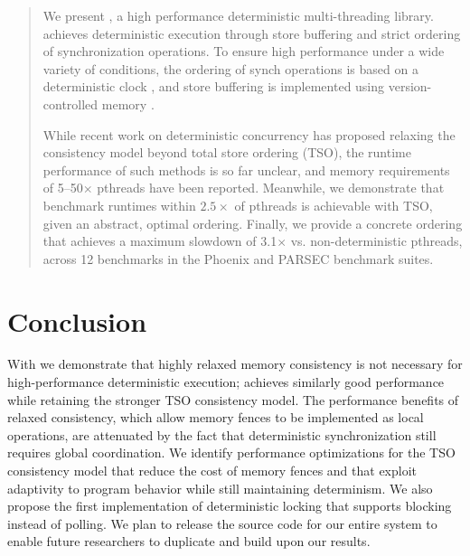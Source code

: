 \documentclass{sigplanconf}
\begin{document}
\newcommand{\TODO}[1]{\textbf{\textcolor{red}{[ TODO: #1]}}}


\begin{abstract}

We present \lib{}, a high performance deterministic multi-threading library. 
\lib{} achieves deterministic execution through store buffering and strict ordering of synchronization operations.
To ensure high performance under a wide variety of conditions, the ordering of synch operations is based on a deterministic clock \cite{olszewski_kendo:_2009}, 
and store buffering is implemented using version-controlled memory \cite{merrifield_conversion:_2013}.

While recent work on deterministic concurrency \cite{devietti_rcdc:_2011,kai_lu_efficient_2014} has proposed relaxing the consistency model beyond total store ordering (TSO), the runtime performance of such methods is so far unclear, and memory requirements of 5--50$\times$ pthreads have been reported\cite{kai_lu_efficient_2014}.
Meanwhile, we demonstrate that benchmark runtimes within $2.5\times$ of pthreads is achievable with TSO, given an abstract, optimal ordering. Finally, we provide a concrete ordering that achieves a maximum slowdown of 3.1$\times$ vs. non-deterministic pthreads, across 12 benchmarks in the Phoenix and PARSEC benchmark suites.

\end{abstract}




%
%





\section{Conclusion}

With \lib we demonstrate that highly relaxed memory consistency is not necessary for high-performance deterministic execution; \lib achieves similarly good performance while retaining the stronger TSO consistency model. The performance benefits of relaxed consistency, which allow memory fences to be implemented as local operations, are attenuated by the fact that deterministic synchronization still requires global coordination. We identify performance optimizations for the TSO consistency model that reduce the cost of memory fences and that exploit adaptivity to program behavior while still maintaining determinism. We also propose the first implementation of deterministic locking that supports blocking instead of polling.
We plan to release the source code for our entire system to enable future researchers to duplicate and build upon our results.
\end{document}
